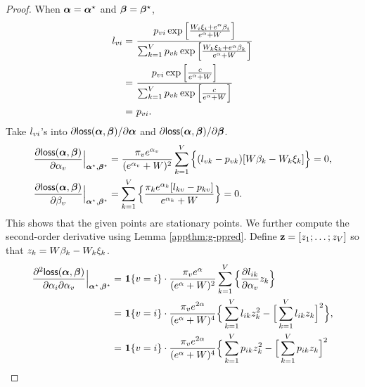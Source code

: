 \begin{proof}
When $\bm{\alpha}=\bm{\alpha}^\star$ and $\boldsymbol{\beta}=\boldsymbol{\beta}^\star$, 
\begin{align*}
l_{vi} = &~ \frac{p_{vi} \exp\Big[\frac{W_i\xi_i+e^{\alpha}\beta_i}{e^{\alpha}+W}\Big]}{\sum_{k=1}^V p_{vk}\exp\Big[\frac{W_k\xi_k+e^{\alpha}\beta_k}{e^{\alpha}+W}\Big]} \\
 = &~ \frac{p_{vi} \exp\Big[\frac{c}{e^{\alpha}+W}\Big]}{\sum_{k=1}^V p_{vk}\exp\Big[\frac{c}{e^{\alpha}+W}\Big]} \\
 = &~ p_{vi}.
\end{align*}
Take $l_{vi}$'s into $\partial \mathsf{loss}(\bm{\alpha},\boldsymbol{\beta})/\partial \bm{\alpha}$ and $\partial \mathsf{loss}(\bm{\alpha},\boldsymbol{\beta})/\partial \boldsymbol{\beta}$.
\begin{align*}
\frac{\partial \mathsf{loss}(\bm{\alpha},\boldsymbol{\beta})}{\partial \alpha_v}\Big |_{\bm{\alpha}^\star,\boldsymbol{\beta}^\star} & = \frac{\pi_v e^{\alpha_v}}{(e^{\alpha_v}+W)^2} 
\sum_{k=1}^V \Big\{(l_{vk}-p_{vk}) [W \beta_k - W_k \xi_k]
\Big\} = 0,\\
\frac{\partial \mathsf{loss}(\bm{\alpha},\boldsymbol{\beta})}{\partial \beta_v}\Big |_{\bm{\alpha}^\star,\boldsymbol{\beta}^\star} & = \sum_{k=1}^V \Big\{\frac{\pi_k e^{\alpha_k} [l_{kv}-p_{kv} ]}{e^{\alpha_k}+W}\Big\} = 0.
\end{align*}
This shows that the given points are stationary points. We further compute the second-order derivative using Lemma \ref{appthm:g-ppred}. Define ${\mathbf z}=[z_1;\ldots;z_V]$ so that $z_k = W \beta_k - W_k \xi_k$.
\begin{align*}
\frac{\partial^2 \loss(\vecsink, \vecvalue)}{\partial \sink_\toki \partial \sink_\tok} \Big |_{\vecsink^\star,\vecvalue^\star} =  ~& \bm{1}\{\tok=\toki\}\cdot \frac{\stable_\tok e^{\sink}}{(e^{\sink}+W)^2} 
\sum_{\tokk=1}^\vocabsize \Big\{\frac{\partial \ppred_{\toki\tokk}}{\partial \sink_\tok} z_\tokk
\Big\}\\
=  ~& \bm{1}\{\tok=\toki\}\cdot \frac{\stable_\tok e^{2\sink}}{(e^{\sink}+W)^4} 
\Big\{ \sum_{\tokk=1}^\vocabsize \ppred_{\toki\tokk} z_\tokk^2 - \Big[\sum_{\tokk=1}^\vocabsize \ppred_{\toki\tokk}z_\tokk \Big]^2
\Big\},\\
=  ~& \bm{1}\{\tok=\toki\}\cdot \frac{\stable_\tok e^{2\sink}}{(e^{\sink}+W)^4} 
\Big\{ \sum_{\tokk=1}^\vocabsize \transition_{\toki\tokk} z_\tokk^2 - \Big[\sum_{\tokk=1}^\vocabsize \transition_{\toki\tokk}z_\tokk \Big]^2

\end{align*}
\end{proof}

